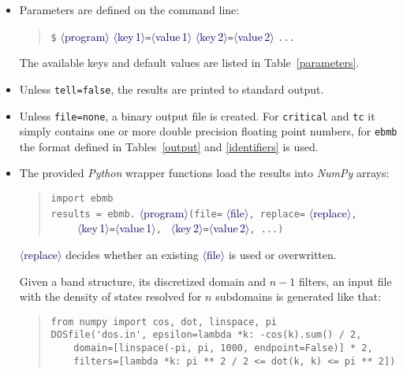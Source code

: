 \documentclass[a4paper]{article}
\def\dummy#1{\textcolor{darkblue}{$\langle$#1$\rangle$}}
\begin{document}
   \begin{itemize}
      \item
         Parameters are defined on the command line:
         \begin{quote}
            \verb|$| \dummy{program}
               \dummy{key\,1}\verb|=|\dummy{value\,1}
               \dummy{key\,2}\verb|=|\dummy{value\,2} \verb|...|
         \end{quote}
         The available keys and default values are listed in
         Table~\ref{parameters}.

      \item
         Unless \texttt{tell=false}, the results are printed to standard output.

      \item
         Unless \texttt{file=none}, a binary output file is created. For
         \texttt{critical} and \texttt{tc} it simply contains one or more double
         precision floating point numbers, for \texttt{ebmb} the format defined
         in Tables~\ref{output} and \ref{identifiers} is used.

      \item
         The provided \emph{Python} wrapper functions load the results into
         \emph{NumPy} arrays:
         \begin{quote}
            \verb|import ebmb| \\
            \verb|results = ebmb.|%
            \dummy{program}\verb|(file=|%
            \dummy{file}\verb|, replace=|%
            \dummy{replace}\verb|,| \\
            \verb|    |%
               \dummy{key\,1}\verb|=|\dummy{value\,1}\verb|, |%
               \dummy{key\,2}\verb|=|\dummy{value\,2}\verb|, ...|\verb|)|
         \end{quote}
         \dummy{replace} decides whether an existing \dummy{file} is used or
         overwritten.

         Given a band structure, its discretized domain and $n - 1$ filters, an
         input file with the density of states resolved for $n$ subdomains is
         generated like that:
         \begin{quote}
            \verb|from numpy import cos, dot, linspace, pi| \\
            \verb|DOSfile('dos.in', epsilon=lambda *k: -cos(k).sum() / 2, | \\
            \verb|    domain=[linspace(-pi, pi, 1000, endpoint=False)] * 2,| \\
            \verb|    filters=[lambda *k: pi ** 2 / 2 <= dot(k, k) <= pi ** 2])|
         \end{quote}
   \end{itemize}
\end{document}
